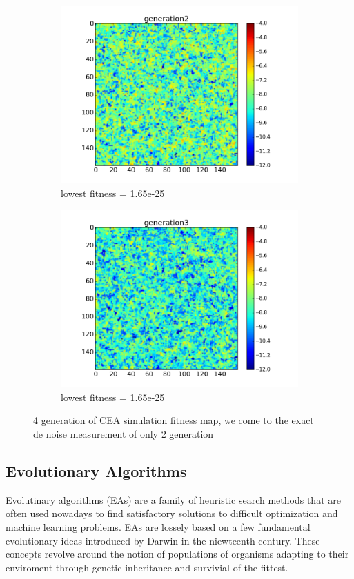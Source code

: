 \documentclass{article}
\begin{document}
\begin{figure}
		\begin{subfigure}[b]{0.4\textwidth}
			\includegraphics[width=\textwidth]{images/CEA/simulation1/generation2}
			\caption{lowest fitness = 1.65e-25}
		\end{subfigure}
		\begin{subfigure}[b]{0.4\textwidth}
			\includegraphics[width=\textwidth]{images/CEA/simulation1/generation3}
			\caption{lowest fitness = 1.65e-25}
		\end{subfigure}
		\caption{4 generation of CEA simulation fitness map, we come to the exact de
		noise measurement of only 2 generation}\label{fig:ceasimulation1}
\end{figure}
\subsection{Evolutionary Algorithms}
Evolutinary algorithms (EAs) are a family of heuristic search methods that are
often used nowadays to find satisfactory solutions to difficult optimization and
machine learning problems. EAs are lossely based on a few fundamental
evolutionary ideas introduced by Darwin in the niewteenth century. These
concepts revolve around the notion of populations of organisms adapting to their
enviroment through genetic inheritance and survivial of the fittest.
\end{document}
